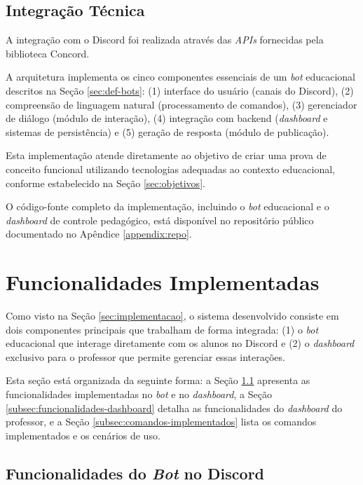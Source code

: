 \subsection{Integração Técnica}
\label{subsec:integracao-tecnica}

A integração com o Discord foi realizada através das \textit{APIs} fornecidas
pela biblioteca Concord.

A arquitetura implementa os cinco componentes essenciais de um \textit{bot}
educacional descritos na Seção \ref{sec:def-bots}: (1) interface do usuário
(canais do Discord), (2) compreensão de linguagem natural (processamento de
comandos), (3) gerenciador de diálogo (módulo de interação), (4) integração com
backend (\textit{dashboard} e sistemas de persistência) e (5) geração de
resposta (módulo de publicação).

Esta implementação atende diretamente ao objetivo de criar uma prova de conceito
funcional utilizando tecnologias adequadas ao contexto educacional, conforme
estabelecido na Seção \ref{sec:objetivos}.

O código-fonte completo da implementação, incluindo o \textit{bot} educacional 
e o \textit{dashboard} de controle pedagógico, está disponível no repositório 
público documentado no Apêndice \ref{appendix:repo}.

\section{Funcionalidades Implementadas}
\label{sec:funcionalidades}

Como visto na Seção \ref{sec:implementacao}, o sistema desenvolvido consiste em
dois componentes principais que trabalham de forma integrada: (1) o \textit{bot}
educacional que interage diretamente com os alunos no Discord e (2) o
\textit{dashboard} exclusivo para o professor que permite gerenciar essas
interações.

Esta seção está organizada da seguinte forma: a Seção
\ref{subsec:funcionalidades-bot} apresenta as funcionalidades implementadas no
\textit{bot} e no \textit{dashboard}, a Seção
\ref{subsec:funcionalidades-dashboard} detalha as funcionalidades do
\textit{dashboard} do professor, e a Seção \ref{subsec:comandos-implementados}
lista os comandos implementados e os cenários de uso.

\subsection{Funcionalidades do \textit{Bot} no Discord}
\label{subsec:funcionalidades-bot}

